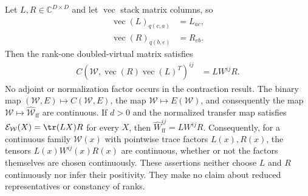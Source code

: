 \begin{lemma}
    \label{thm:mpu_factor_free_sandwich_continuous}
    \leanok
    Let $L,R\in\mathbb C^{D\times D}$ and let $\operatorname{vec}$ stack
    matrix columns, so
    \begin{align}
        \operatorname{vec}(L)_{q(c,a)} & =L_{ac}, \\
        \operatorname{vec}(R)_{q(b,e)} & =R_{eb}.
    \end{align}
    Then the rank-one doubled-virtual matrix satisfies
    \begin{align}
        C\!\left(\mathcal W,
        \operatorname{vec}(R)\operatorname{vec}(L)^T\right)^{ij}
         & =L W^{ij}R.
        \label{eq:mpu_factor_free_rank_one}
    \end{align}
    No adjoint or normalization factor occurs in the contraction result. The
    binary map
    $(\mathcal W,E)\mapsto C(\mathcal W,E)$, the map
    $\mathcal W\mapsto E(\mathcal W)$, and consequently the map
    $\mathcal W\mapsto\widehat{\mathcal W}_{\mathrm{ff}}$ are continuous.
    If $d>0$ and the normalized transfer map satisfies
    $\mathcal E_{\mathcal W}(X)=\tr(LX)R$ for every $X$, then
    $\widehat W_{\mathrm{ff}}^{ij}=LW^{ij}R$.
    Consequently, for a continuous family $\mathcal W(x)$ with pointwise
    trace factors $L(x),R(x)$, the tensors $L(x)W^{ij}(x)R(x)$ are continuous,
    whether or not the factors themselves are chosen continuously.
    These assertions neither choose $L$ and $R$ continuously nor infer their
    positivity. They make no claim about reduced representatives or constancy
    of ranks.
\end{lemma}


